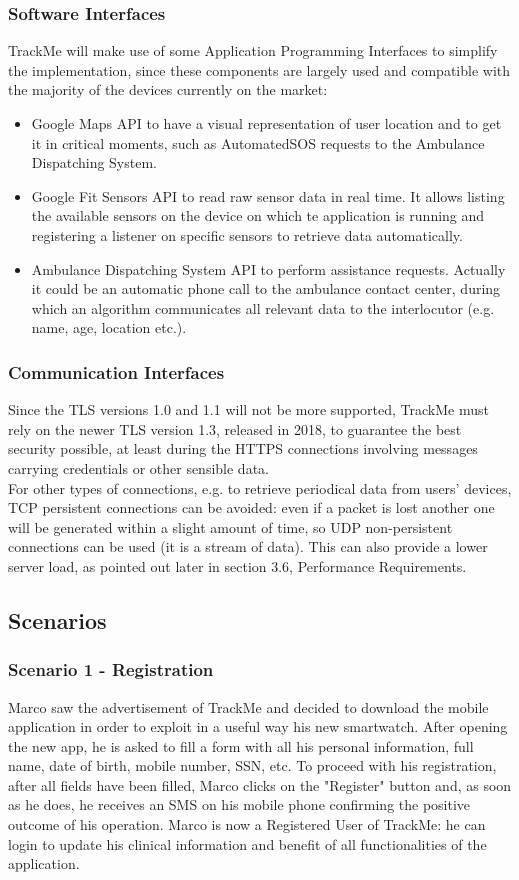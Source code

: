 \documentclass[12pt,a4paper]{article}
\begin{document}
	\subsubsection{Software Interfaces}
		TrackMe will make use of some Application Programming Interfaces to simplify the implementation, since these components are largely used and compatible with the majority of the devices currently on the market:
		\begin{itemize}
			\item Google Maps API to have a visual representation of user location and to get it in critical moments, such as AutomatedSOS requests to the Ambulance Dispatching System.
			\item Google Fit Sensors API to read raw sensor data in real time. It allows listing the available sensors on the device on which te application is running and registering a listener on specific sensors to retrieve data automatically.
			\item Ambulance Dispatching System API to perform assistance requests. Actually it could be an automatic phone call to the ambulance contact center, during which an algorithm communicates all relevant data to the interlocutor (e.g. name, age, location etc.).
		\end{itemize}
	\subsubsection{Communication Interfaces}
			Since the TLS versions 1.0 and 1.1 will not be more supported, TrackMe must rely on the newer TLS version 1.3, released in 2018, to guarantee the best security possible, at least during the HTTPS connections involving messages carrying credentials or other sensible data.
			\\
			For other types of connections, e.g. to retrieve periodical data from users' devices, TCP persistent connections can be avoided: even if a packet is lost another one will be generated within a slight amount of time, so UDP non-persistent connections can be used (it is a stream of data). This can also provide a lower server load, as pointed out later in section 3.6, Performance Requirements.


	\newpage
	\subsection{Scenarios}
	\subsubsection*{Scenario 1 - Registration}
		Marco saw the advertisement of TrackMe and decided to download the mobile application in order to exploit in a useful way his new smartwatch. After opening the new app, he is asked to fill a form with all his personal information, full name, date of birth, mobile number, SSN, etc. To proceed with his registration, after all fields have been filled, Marco clicks on the "Register" button and, as soon as he does, he receives an SMS on his mobile phone confirming the positive outcome of his operation. Marco is now a Registered User of TrackMe: he can login to update his clinical information and benefit of all functionalities of the application.
\end{document}
